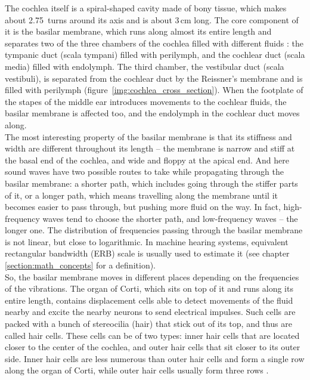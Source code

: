 The cochlea itself is a spiral-shaped cavity made of bony tissue, which makes about 2.75~turns around its axis and is about 3\,cm long. The core component of it is the basilar membrane, which runs along almost its entire length and separates two of the three chambers of the cochlea filled with different fluids \cite{Schnupp2011}: the tympanic duct (scala tympani) filled with perilymph, and the cochlear duct (scala media) filled with endolymph. The third chamber, the vestibular duct (scala vestibuli), is separated from the cochlear duct by the Reissner’s membrane and is filled with peri\-lymph (figure~\ref{img:cochlea_cross_section}). When the footplate of the stapes of the middle ear introduces movements to the cochlear fluids, the basilar membrane is affected too, and the endolymph in the cochlear duct moves along.\\

The most interesting property of the basilar membrane is that its stiffness and width are different throughout its length – the membrane is narrow and stiff at the basal end of the cochlea, and wide and floppy at the apical end. And here sound waves have two possible routes to take while propagating through the basilar membrane: a shorter path, which includes going through the stiffer parts of it, or a longer path, which means travelling along the membrane until it becomes easier to pass through, but pushing more fluid on the way. In fact, high-frequency waves tend to choose the shorter path, and low-frequency waves – the longer one. The distribution of frequencies passing through the basilar membrane is not linear, but close to logarithmic. In machine hearing systems, equivalent rectangular bandwidth (ERB) scale is usually used to estimate it (see chapter \ref{section:math_concepts} for a definition).\\

So, the basilar membrane moves in different places depending on the frequencies of the vibrations. The organ of Corti, which sits on top of it and runs along its entire length, contains displacement cells able to detect movements of the fluid nearby and excite the nearby neurons to send electrical impulses. Such cells are packed with a bunch of stereocilia (hair) that stick out of its top, and thus are called hair cells. These cells can be of two types: inner hair cells that are located closer to the center of the cochlea, and outer hair cells that sit closer to its outer side. Inner hair cells are less numerous than outer hair cells and form a single row along the organ of Corti, while outer hair cells usually form three rows \cite{Schnupp2011}.\\


